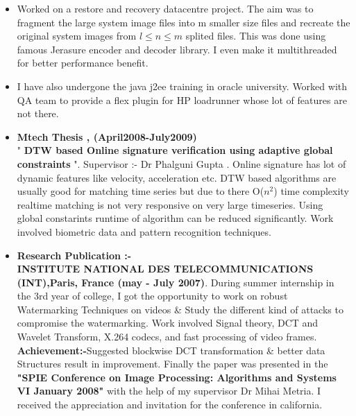 \documentclass[]{res}
\makeatletter
\newcommand{\resitem}[1]{\item #1 \vspace{-2pt}}
\newcommand{\ressubheading}[4]{
\begin{tabular*}{6.5in}{l@{\extracolsep{\fill}}r}
		\textbf{#1} & #2 \\
		\textit{#3} & \textit{#4} \\
\end{tabular*}\vspace{-6pt}}
\makeatother
\begin{document}
\begin{description}
\begin{itemize}


\resitem{ Worked on a restore and recovery datacentre project. The aim was to fragment the  large system image files into m smaller size files and recreate the original system images from  $l \leq{ n} \leq{ m}$ splited files. This was done using famous Jerasure encoder and decoder library. I even make it multithreaded for better performance benefit.}   





\resitem{  I have also undergone the java j2ee training in oracle university. Worked with QA team to provide a flex plugin for HP loadrunner whose lot of features are not there.}   

\end {itemize}





\item[]
\begin{itemize}
	\item \textbf{Mtech Thesis     ,                                                                        (April2008-July2009) }\\
	" \textbf{DTW based Online signature verification using adaptive global constraints} ".  Supervisor :- Dr Phalguni Gupta .
Online signature has lot of dynamic features like velocity, acceleration etc. DTW based algorithms are usually good for matching time series but due to there O($n^2$) time complexity realtime matching is not very responsive on very large timeseries. Using global constarints runtime of algorithm can be reduced significantly. Work involved biometric data and pattern recognition techniques.
\end{itemize}


\item[]
\begin{itemize}
	\item \textbf {Research Publication :-}\\
	 \textbf{INSTITUTE NATIONAL DES TELECOMMUNICATIONS (INT),Paris, France  (may - July 2007)}.  
	During summer internship in the 3rd year of college, I got the opportunity to work on robust Watermarking  Techniques on videos \& Study the different kind of attacks to compromise the watermarking. Work involved Signal theory, DCT and Wavelet Transform, X.264 codecs, and fast processing of video frames. \textbf{Achievement:-}Suggested blockwise DCT transformation \&  better data Structures result in improvement. Finally the paper was presented in the \textbf{"SPIE Conference on Image Processing: Algorithms and Systems VI January 2008"}  with the help of my supervisor Dr Mihai Metria. I received the appreciation and invitation for the conference in california. 
\end{itemize}


\end{description}
\end{document}
